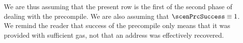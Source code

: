 \begin{center}
\end{center}
We are thus assuming that the present row is the first of the second phase of dealing with the  precompile.
We are also assuming that $\scenPrcSuccess \equiv 1$.
We remind the reader that success of the  precompile only means that it was provided with sufficient gas, not that an address was effectively recovered.
